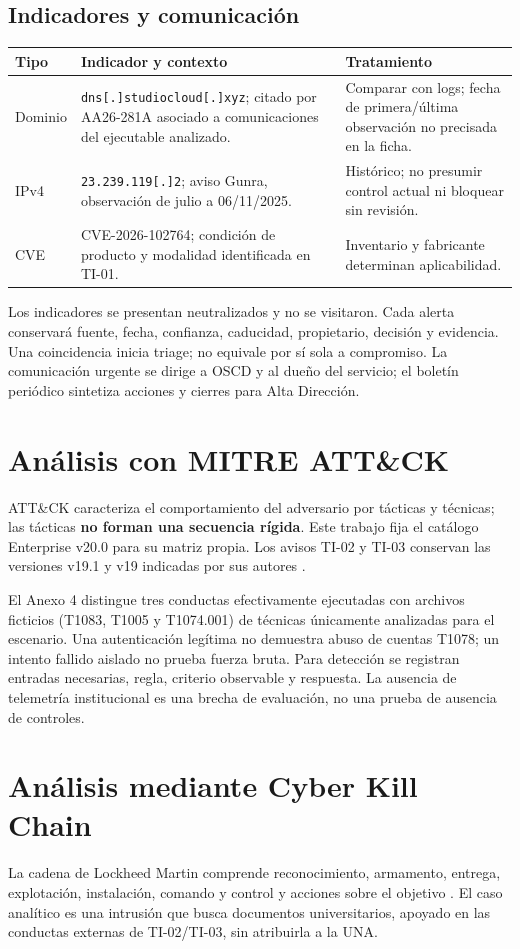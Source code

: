 \documentclass[10pt,a4paper]{article}
\newcommand{\archivo}[1]{{\ttfamily\nolinkurl{#1}}}
\newcommand{\cabecera}[1]{\textbf{#1}}
\begin{document}
\subsection{Indicadores y comunicación}
\begin{tabularx}{\linewidth}{P{32mm}Y P{42mm}}
\toprule\cabecera{Tipo} & \cabecera{Indicador y contexto} & \cabecera{Tratamiento}\\\midrule
Dominio & \archivo{dns[.]studiocloud[.]xyz}; citado por AA26-281A asociado a comunicaciones del ejecutable analizado. & Comparar con logs; fecha de primera/última observación no precisada en la ficha.\\
IPv4 & \archivo{23.239.119[.]2}; aviso Gunra, observación de julio a 06/11/2025. & Histórico; no presumir control actual ni bloquear sin revisión.\\
CVE & CVE-2026-102764; condición de producto y modalidad identificada en TI-01. & Inventario y fabricante determinan aplicabilidad.\\\bottomrule
\end{tabularx}
Los indicadores se presentan neutralizados y no se visitaron. Cada alerta conservará fuente, fecha, confianza, caducidad, propietario, decisión y evidencia. Una coincidencia inicia triage; no equivale por sí sola a compromiso. La comunicación urgente se dirige a OSCD y al dueño del servicio; el boletín periódico sintetiza acciones y cierres para Alta Dirección.

\section{Análisis con MITRE ATT\&CK}
ATT\&CK caracteriza el comportamiento del adversario por tácticas y técnicas; las tácticas \textbf{no forman una secuencia rígida}. Este trabajo fija el catálogo Enterprise v20.0 para su matriz propia. Los avisos TI-02 y TI-03 conservan las versiones v19.1 y v19 indicadas por sus autores \cite{R08,R18,R20}.

El Anexo 4 distingue tres conductas efectivamente ejecutadas con archivos ficticios (T1083, T1005 y T1074.001) de técnicas únicamente analizadas para el escenario. Una autenticación legítima no demuestra abuso de cuentas T1078; un intento fallido aislado no prueba fuerza bruta. Para detección se registran entradas necesarias, regla, criterio observable y respuesta. La ausencia de telemetría institucional es una brecha de evaluación, no una prueba de ausencia de controles.

\section{Análisis mediante Cyber Kill Chain}
La cadena de Lockheed Martin comprende reconocimiento, armamento, entrega, explotación, instalación, comando y control y acciones sobre el objetivo \cite{R07}. El caso analítico es una intrusión que busca documentos universitarios, apoyado en las conductas externas de TI-02/TI-03, sin atribuirla a la UNA.
\end{document}
